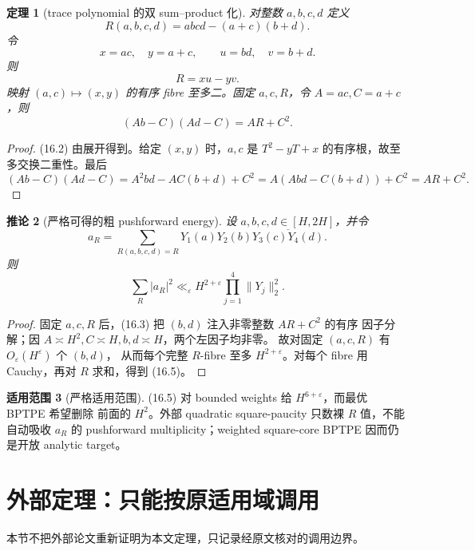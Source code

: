 \documentclass[11pt,a4paper]{ctexart}
\newtheorem{theorem}{定理}[section]
\newtheorem{corollary}[theorem]{推论}
\theoremstyle{definition}
\newtheorem{remark}[theorem]{适用范围}
\newcommand{\1}{\mathbf 1}
\begin{document}
\begin{theorem}[trace polynomial 的双 sum--product 化]\label{thm:tool-bptrace}
对整数 $a,b,c,d$ 定义
\[
R(a,b,c,d)=abcd-(a+c)(b+d).
\tag{16.1}
\]
令
\[
x=ac,\quad y=a+c,\qquad u=bd,\quad v=b+d.
\]
则
\[
\boxed{R=xu-yv.}
\tag{16.2}
\]
映射 $(a,c)\mapsto(x,y)$ 的有序 fibre 至多二。固定 $a,c,R$，令
$A=ac,C=a+c$，则
\[
\boxed{(Ab-C)(Ad-C)=AR+C^2.}
\tag{16.3}
\]
\end{theorem}

\begin{proof}
(16.2) 由展开得到。给定 $(x,y)$ 时，$a,c$ 是
$T^2-yT+x$ 的有序根，故至多交换二重性。最后
\[
(Ab-C)(Ad-C)
=A^2bd-AC(b+d)+C^2
=A(Abd-C(b+d))+C^2=AR+C^2.
\]
\end{proof}

\begin{corollary}[严格可得的粗 pushforward energy]\label{cor:tool-crude}
设 $a,b,c,d\in[H,2H]$，并令
\[
a_R=\sum_{R(a,b,c,d)=R}
Y_1(a)Y_2(b)\overline{Y_3(c)Y_4(d)}.
\tag{16.4}
\]
则
\[
\boxed{
\sum_R|a_R|^2\ll_\varepsilon H^{2+\varepsilon}
\prod_{j=1}^4\|Y_j\|_2^2.}
\tag{16.5}
\]
\end{corollary}

\begin{proof}
固定 $a,c,R$ 后，(16.3) 把 $(b,d)$ 注入非零整数 $AR+C^2$ 的有序
因子分解；因 $A\asymp H^2,C\asymp H,b,d\asymp H$，两个左因子均非零。
故对固定 $(a,c,R)$ 有 $O_\varepsilon(H^\varepsilon)$ 个 $(b,d)$，
从而每个完整 $R$-fibre 至多 $H^{2+\varepsilon}$。对每个 fibre 用
Cauchy，再对 $R$ 求和，得到 (16.5)。
\end{proof}

\begin{remark}[严格适用范围]
(16.5) 对 bounded weights 给 $H^{6+\varepsilon}$，而最优 BPTPE 希望删除
前面的 $H^2$。外部 quadratic square-paucity 只数裸 $R$ 值，不能自动吸收
$a_R$ 的 pushforward multiplicity；weighted square-core BPTPE 因而仍是开放
analytic target。
\end{remark}

\section{外部定理：只能按原适用域调用}

本节不把外部论文重新证明为本文定理，只记录经原文核对的调用边界。
\end{document}

